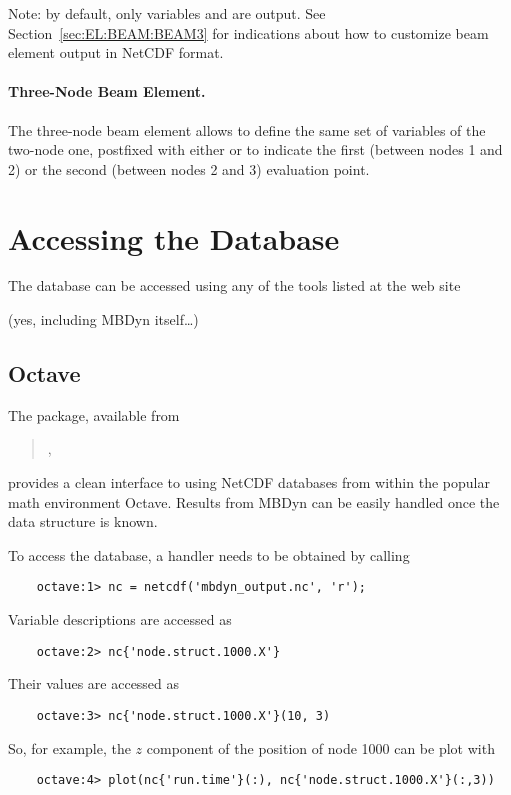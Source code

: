 Note: by default, only variables 
and  are output.
See Section~\ref{sec:EL:BEAM:BEAM3} for indications
about how to customize beam element output in NetCDF format.

\paragraph{Three-Node Beam Element.}
The three-node beam element allows to define the same set of variables
of the two-node one, postfixed with either  or 
to indicate the first (between nodes 1 and 2)
or the second (between nodes 2 and 3)
evaluation point.






\section{Accessing the Database}
The database can be accessed using any of the tools listed at the web site
\begin{quote}
\end{quote}
(yes, including MBDyn itself\ldots)



\subsection{Octave}
The  package, available from
\begin{quote}
,
\end{quote}
provides a clean interface to using NetCDF databases from within
the popular math environment Octave.
Results from MBDyn can be easily handled once the data structure is known.

To access the database, a handler needs to be obtained by calling
\begin{verbatim}
    octave:1> nc = netcdf('mbdyn_output.nc', 'r');
\end{verbatim}
Variable descriptions are accessed as
\begin{verbatim}
    octave:2> nc{'node.struct.1000.X'}
\end{verbatim}
Their values are accessed as
\begin{verbatim}
    octave:3> nc{'node.struct.1000.X'}(10, 3)
\end{verbatim}
So, for example, the $z$ component of the position of node 1000 can be plot with 
\begin{verbatim}
    octave:4> plot(nc{'run.time'}(:), nc{'node.struct.1000.X'}(:,3))
\end{verbatim}

